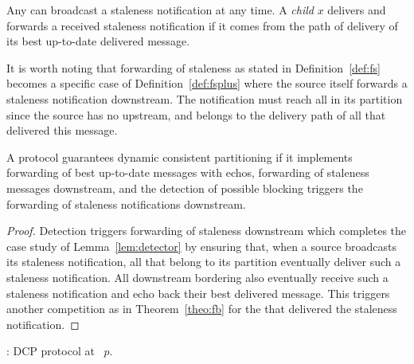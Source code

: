 \begin{definition} Any \emph{\process} can broadcast a
  staleness notification at any time. A \emph{child \process} $x$
  delivers and forwards a received staleness notification if it comes
  from the path of delivery of its best up-to-date delivered
  message.
\end{definition}

It is worth noting that forwarding of staleness as stated in
Definition~\ref{def:fs} becomes a specific case of
Definition~\ref{def:fsplus} where the source itself forwards a
staleness notification downstream. The notification must reach all
\processes in its partition since the source has no \processes
upstream, and belongs to the delivery path of all \processes that
delivered this message.

\begin{theorem}
  A protocol guarantees dynamic consistent partitioning if it
  implements forwarding of best up-to-date messages with echos,
  forwarding of staleness messages downstream, and the detection of
  possible blocking triggers the forwarding of staleness notifications
  downstream.
\end{theorem}

\begin{proof}
  Detection triggers forwarding of staleness downstream which
  completes the case study of Lemma~\ref{lem:detector} by ensuring
  that, when a source broadcasts its staleness notification, all
  \processes that belong to its partition eventually deliver such a
  staleness notification. All downstream bordering \processes also
  eventually receive such a staleness notification and echo back their
  best delivered message. This triggers another competition as in
  Theorem~\ref{theo:fb} for the \processes that delivered the
  staleness notification.
\end{proof}

\begin{algorithm}
  
  \caption{\label{algo:ascast}\NAME: DCP protocol at \Process~$p$.}
\end{algorithm}

